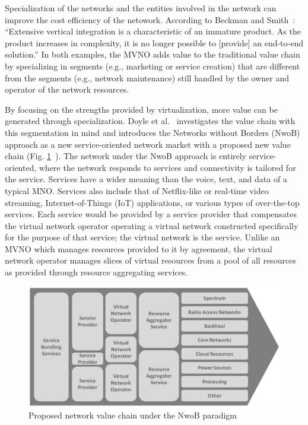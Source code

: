 \documentclass[12pt,dvipsnames]{report}
\begin{document}
Specialization of the networks and the entities involved in the network can improve the cost efficiency of the netowork.  According to Beckman and Smith~\cite{1421931}: ``Extensive vertical integration is a characteristic of an immature product.  As the product increases in complexity, it is no longer possible to [provide] an end-to-end solution.'' In both examples, the MVNO adds value to the traditional value chain by specializing in segments (e.g., marketing or service creation) that are different from the segments (e.g., network maintenance) still handled by the owner and operator of the network resources.

By focusing on the strengths provided by virtualization, more value can be generated through specialization.  Doyle et al.~\cite{6737248} investigates the value chain with this segmentation in mind and introduces the Networks without Borders (NwoB) approach as a new service-oriented network market with a proposed new value chain (Fig. \ref{fig:NwoBValueChain}~\cite{6737248}).  The network under the NwoB approach is entirely service-oriented, where the network responds to services and connectivity is tailored for the service.  Services have a wider meaning than the voice, text, and data of a typical MNO.  Services also include that of Netflix-like or real-time video streaming, Internet-of-Things (IoT) applications, or various types of over-the-top services.  Each service would be provided by a service provider that compensates the virtual network operator operating a virtual network constructed specifically for the purpose of that service; the virtual network is the service.  Unlike an MVNO which manages resources provided to it by agreement, the virtual network operator manages slices of virtual resources from a pool of all resources as provided through resource aggregating services.

\begin{figure}
	\centering
	\includegraphics[width=\linewidth]{NwoBValueChain}
	\caption[Proposed network value chain under the NwoB paradigm]{\small Proposed network value chain under the NwoB paradigm~\cite{6737248}}
	\label{fig:NwoBValueChain}
\end{figure}
\end{document}
